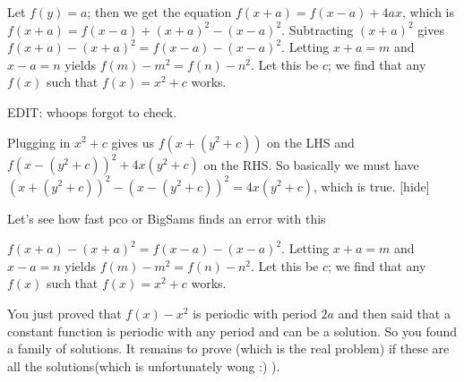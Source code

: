 \begin{solution}
Let $f(y) = a$; then we get the equation $f(x + a) = f(x - a) + 4ax$, which is $f(x + a) = f(x - a) + (x + a)^2 - (x - a)^2$.  Subtracting $(x + a)^2$ gives $f(x + a) - (x + a)^2 = f(x - a) - (x - a)^2$.  Letting $x + a = m$ and $x - a = n$ yields $f(m) - m^2 = f(n) - n^2$.  Let this be $c$; we find that any $f(x)$ such that $f(x) = \boxed{x^2 + c}$ works.

EDIT: whoops forgot to check.  

Plugging in $x^2 + c$ gives us $f(x + (y^2 + c))$ on the LHS and $f(x - (y^2 + c))^2 + 4x(y^2 + c)$ on the RHS.  So basically we must have $(x + (y^2 + c))^2 - (x - (y^2 + c))^2 = 4x(y^2 + c)$, which is true.
[\/hide]

Let's see how fast pco or BigSams finds an error with this
\end{solution}



\begin{solution}
	\begin{tcolorbox} $f(x + a) - (x + a)^2 = f(x - a) - (x - a)^2$.  Letting $x + a = m$ and $x - a = n$ yields $f(m) - m^2 = f(n) - n^2$.  Let this be $c$; we find that any $f(x)$ such that $f(x) = \boxed{x^2 + c}$ works.\end{tcolorbox}
You just proved that $f(x)-x^2$ is periodic with period $2a$ and then said that a constant function is periodic with any period and can be a solution.
So you found a family of solutions.
It remains to prove (which is the real problem) if these are all the solutions(which is unfortunately wong :) ).
\end{solution}



